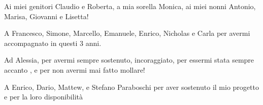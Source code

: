 \begin{flushright}
Ai miei genitori Claudio e Roberta, a mia sorella Monica, ai miei nonni Antonio, Marisa, Giovanni e Lisetta!

\bigskip

A Francesco, Simone, Marcello, Emanuele, Enrico, Nicholas e Carla per avermi accompagnato in questi 3 anni.

\bigskip

Ad Alessia, per avermi sempre sostenuto, incoraggiato, per essermi stata sempre accanto , e per non avermi mai fatto mollare! 

\bigskip

A Enrico, Dario, Mattew, e Stefano Paraboschi per aver sostenuto il mio progetto e per la loro disponibilità


\end{flushright}